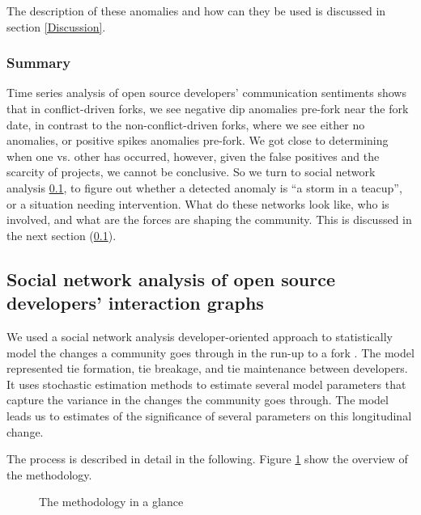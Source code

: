 \documentclass[12pt,letterpaper]{gthesis2}  %
\begin{document}
\pagebreak

The description of these anomalies and how can they be used is discussed in section \ref{Discussion}.

\subsubsection{Summary}
Time series analysis of open source developers’ communication sentiments shows that in conflict-driven forks, we see negative dip anomalies pre-fork near the fork date, in contrast to the non-conflict-driven forks, where we see either no anomalies, or positive spikes anomalies pre-fork. 
We got close to determining when one vs. other has occurred, however, given the false positives and the scarcity of projects, we cannot be conclusive. So we turn to social network analysis \ref{socialNetworkAnalysisMethodology}, to figure out whether a detected anomaly is ``a storm in a teacup'', or a situation needing intervention. What do these networks look like, who is involved, and what are the forces are shaping the community. This is discussed in the next section (\ref{socialNetworkAnalysisMethodology}).


\subsection{Social network analysis of open source developers’ interaction graphs}
\label{socialNetworkAnalysisMethodology}
We used a social network analysis developer-oriented approach to statistically model the changes a community goes through in the run-up to a fork \cite{AzarbakhtOSS2017}. The model represented tie formation, tie breakage, and tie maintenance between developers. It uses stochastic estimation methods to estimate several model parameters that capture the variance in the changes the community goes through. The model leads us to estimates of the significance of several parameters on this longitudinal change.

The process is described in detail in the following. Figure \ref{FlowChart} show the overview of the methodology.

\begin{figure}[!ht]
\centering
{}
\caption{The methodology in a glance}
\label{FlowChart}
\end{figure}

%
\end{document}
